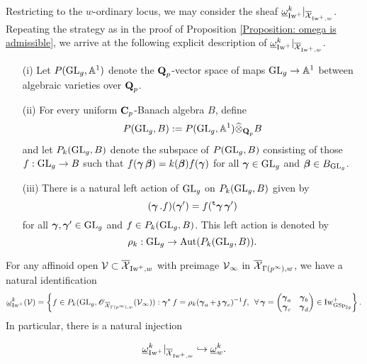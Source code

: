 Restricting to the $w$-ordinary locus, we may consider the sheaf $\underline{\omega}_{\Iw^+}^{k}|_{\overline{\calX}_{\Iw^+, w}}$. Repeating the strategy as in the proof of Proposition \ref{Proposition: omega is admissible}, we arrive at the following explicit description of $\underline{\omega}_{\Iw^+}^{k}|_{\overline{\calX}_{\Iw^+, w}}$.

\begin{Definition}\label{Definition: algebraic functions}
\begin{enumerate}
\item[(i)] Let $P(\GL_g, \mathbb{A}^1)$ denote the $\Q_p$-vector space of maps $\GL_g\rightarrow \mathbb{A}^1$ between algebraic varieties over $\Q_p$.
\item[(ii)] For every uniform $\C_p$-Banach algebra $B$, define $$P(\GL_g, B):=P(\GL_g, \mathbb{A}^1)\widehat{\otimes}_{\Q_p}B$$
and let $P_k(\GL_g, B)$ denote the subspace of $P(\GL_g, B)$ consisting of those $f:\GL_g \rightarrow B$ such that $f(\bfgamma\bfbeta) =k(\bfbeta)f(\bfgamma)$ for all $\bfgamma\in \GL_{g}$ and  $\bfbeta\in B_{\GL_{g}}$.
\item[(iii)] There is a natural left action of $\GL_g$ on $P_k(\GL_g, B)$ given by
$$(\bfgamma.f)(\bfgamma')=f(\trans \bfgamma\bfgamma')$$
for all $\bfgamma, \bfgamma'\in \GL_g$ and $f\in P_k(\GL_g, B)$. This left action is denoted by $$\rho_k: \GL_g\rightarrow \Aut(P_k(\GL_g, B)).$$
\end{enumerate}
\end{Definition}

\begin{Proposition}\label{Proposition: explicit description of classical modular sheaf}
For any affinoid open $\calV\subset \overline{\calX}_{\Iw^+, w}$ with preimage $\calV_{\infty}$ in $\overline{\calX}_{\Gamma(p^{\infty}), w}$, we have a natural identification
$$
        \underline{\omega}_{\Iw^+}^{k}(\calV) = \left\{f \in P_k(\GL_g, \scrO_{\overline{\calX}_{\Gamma(p^{\infty}), w}}(\calV_{\infty})) :  \bfgamma^* f = \rho_{k}(\bfgamma_a+\frakz\bfgamma_c)^{-1}f, \,\,\,\forall \bfgamma = \begin{pmatrix}\bfgamma_a & \bfgamma_b\\ \bfgamma_c & \bfgamma_d\end{pmatrix} \in \Iw_{\GSp_{2g}}^+ 
        \right\}.
$$
In particular, there is a natural injection
\end{Proposition}
\begin{equation}\label{eq: alg. sheaf into overconvergent sheaf}
    \underline{\omega}_{\Iw^+}^k|_{\overline{\calX}_{\Iw^+, w}} \hookrightarrow \underline{\omega}_w^{k}.
\end{equation} 


